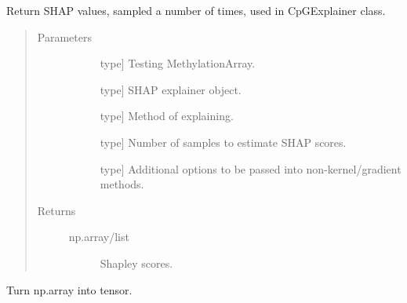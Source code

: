 \documentclass[letterpaper,10pt,english]{sphinxmanual}
\begin{document}
\begin{fulllineitems}
\label{\detokenize{index:methylnet.interpretation_classes.return_shap_values}}
Return SHAP values, sampled a number of times, used in CpGExplainer class.
\begin{quote}\begin{description}
\item[{Parameters}] \leavevmode\begin{description}
\item[{}] \leavevmode{[}type{]}
Testing MethylationArray.

\item[{}] \leavevmode{[}type{]}
SHAP explainer object.

\item[{}] \leavevmode{[}type{]}
Method of explaining.

\item[{}] \leavevmode{[}type{]}
Number of samples to estimate SHAP scores.

\item[{}] \leavevmode{[}type{]}
Additional options to be passed into non-kernel/gradient methods.

\end{description}

\item[{Returns}] \leavevmode\begin{description}
\item[{np.array/list}] \leavevmode
Shapley scores.

\end{description}

\end{description}\end{quote}

\end{fulllineitems}


\begin{fulllineitems}
\label{\detokenize{index:methylnet.interpretation_classes.to_tensor}}
Turn np.array into tensor.

\end{fulllineitems}
\end{document}
